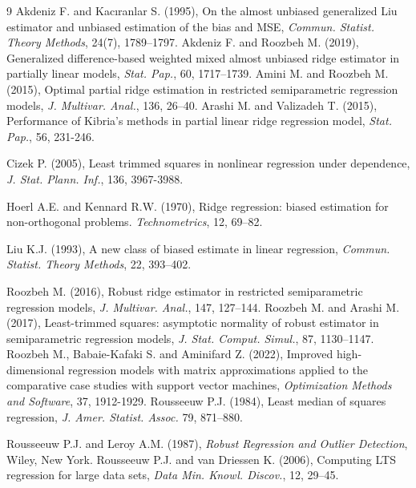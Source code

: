 \documentclass[twoside]{article}
\begin{document}
\begin{thebibliography}{9}
 Akdeniz F. and Kacıranlar S. (1995), On the almost unbiased generalized Liu estimator and unbiased estimation of the bias and MSE, {\it Commun. Statist. Theory Methods}, 24(7), 1789–1797.
 Akdeniz F. and Roozbeh M. (2019), Generalized difference-based weighted mixed almost unbiased ridge estimator in partially linear models, {\it Stat. Pap.}, 60, 1717–1739.
 Amini M. and Roozbeh M. (2015), Optimal partial ridge estimation in restricted semiparametric regression models, {\it J. Multivar. Anal.}, 136, 26–40.
 Arashi M. and Valizadeh T. (2015), Performance of Kibria’s methods in partial linear ridge regression model, {\it Stat. Pap.}, 56, 231-246.

 Cizek P. (2005), Least trimmed squares in nonlinear regression under dependence, {\it J. Stat. Plann. Inf.}, {136}, 3967-3988.

 Hoerl A.E. and Kennard R.W. (1970), Ridge regression: biased estimation for non-orthogonal problems. {\it Technometrics}, 12, 69–82.

 Liu K.J. (1993), A new class of biased estimate in linear regression, {\it Commun. Statist. Theory Methods}, 22, 393–402.

 Roozbeh M. (2016), Robust ridge estimator in restricted semiparametric regression models, {\it J. Multivar. Anal.}, 147, 127–144.
 Roozbeh M. and Arashi M. (2017), Least-trimmed squares: asymptotic normality of robust estimator in semiparametric regression models, {\it J. Stat. Comput. Simul.}, 87, 1130–1147.
 Roozbeh M., Babaie-Kafaki S. and Aminifard Z. (2022), Improved high-dimensional regression models with matrix approximations applied to the comparative case studies with support vector machines, {\it Optimization Methods and Software}, 37, 1912-1929.
 Rousseeuw P.J. (1984), Least median of squares regression, {\it J. Amer. Statist. Assoc.} 79, 871–880.

 Rousseeuw P.J. and Leroy A.M. (1987), {\it Robust Regression and Outlier Detection}, Wiley, New York.
 Rousseeuw P.J. and van Driessen K. (2006), Computing LTS regression for large data sets, {\it Data Min. Knowl. Discov.}, 12, 29–45.


\end{thebibliography}
\end{document}
